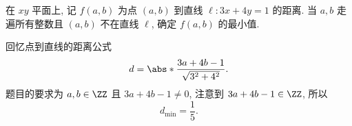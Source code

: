 \begin{prob}
\label{prob:prob-3}
在 $xy$ 平面上, 记 $f(a,b)$ 为点 $(a,b)$ 到直线 $\ell: 3x + 4y = 1$ 的距离.
当 $a,b$ 走遍所有整数且 $(a,b)$ 不在直线 $\ell$, 确定 $f(a,b)$ 的最小值.
\end{prob}

\begin{soln}
回忆点到直线的距离公式
\begin{equation}
\label{eq2}
d = \abs*{\frac{3a + 4b - 1}{\sqrt{3^2 + 4^2}}}.
\end{equation}
题目的要求为 $a,b \in \ZZ$ 且 $3a + 4b - 1 \ne 0$,
注意到 $3a + 4b - 1 \in \ZZ$, 所以
\[
d_{\mathrm{min}} = \boxed{\frac{1}{5}.}
\]
\end{soln}
